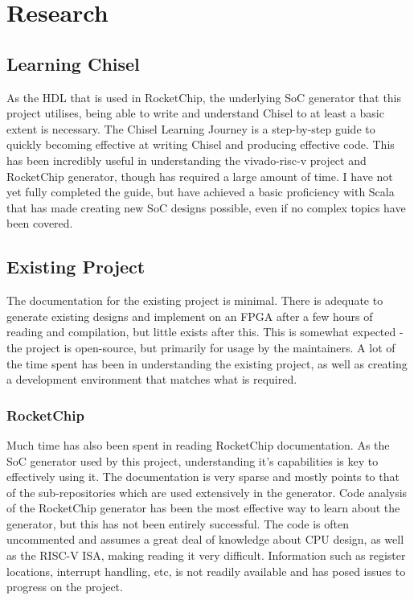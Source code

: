 \section{Research}
\label{sec:background}
\subsection{Learning Chisel}
As the HDL that is used in RocketChip\cite{}, the underlying SoC generator that this project utilises, being able to write and understand Chisel to at least a basic extent is necessary. The Chisel Learning Journey\cite{} is a step-by-step guide to quickly becoming effective at writing Chisel and producing effective code. This has been incredibly useful in understanding the vivado-risc-v\cite{} project and RocketChip generator, though has required a large amount of time. I have not yet fully completed the guide, but have achieved a basic proficiency with Scala that has made creating new SoC designs possible, even if no complex topics have been covered.

\subsection{Existing Project}
The documentation for the existing project is minimal. There is adequate to generate existing designs and implement on an FPGA after a few hours of reading and compilation, but little exists after this. This is somewhat expected - the project is open-source, but primarily for usage by the maintainers. A lot of the time spent has been in understanding the existing project, as well as creating a development environment that matches what is required. 

\subsubsection{RocketChip}
Much time has also been spent in reading RocketChip documentation\cite{}. As the SoC generator used by this project, understanding it's capabilities is key to effectively using it. The documentation is very sparse and mostly points to that of the sub-repositories which are used extensively in the generator. Code analysis of the RocketChip generator has been the most effective way to learn about the generator, but this has not been entirely successful. The code is often uncommented and assumes a great deal of knowledge about CPU design, as well as the RISC-V ISA, making reading it very difficult. Information such as register locations, interrupt handling, etc, is not readily available and has posed issues to progress on the project.

